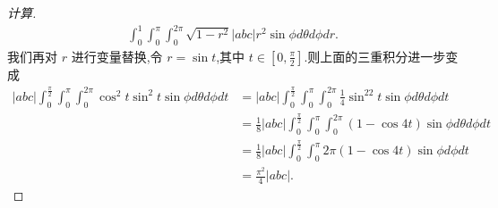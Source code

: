 \documentclass[a4paper, 12pt]{article} %
\begin{document}
\begin{CJK}{UTF8}{gkai}
\begin{proof}[计算]
\begin{align*}
\int_{0}^{1}\int_{0}^{\pi}\int_{0}^{2\pi} \sqrt{1-r^2}|abc|r^2\sin\phi
d\theta d\phi dr.
\end{align*}
我们再对 $r$ 进行变量替换,令 $r=\sin t$,其中 $t\in
[0,\frac{\pi}{2}]$.则上面的三重积分进一步变成
\begin{align*}
|abc|\int_0^{\frac{\pi}{2}}\int_0^{\pi}\int_0^{2\pi}\cos^{2} t\sin^2t\sin\phi
d\theta d\phi
dt&=|abc|\int_0^{\frac{\pi}{2}}\int_0^{\pi}\int_0^{2\pi}\frac{1}{4}\sin^22t\sin\phi
d\theta d\phi
dt\\&=\frac{1}{8}|abc|\int_0^{\frac{\pi}{2}}\int_0^{\pi}\int_0^{2\pi}(1-\cos
4t)\sin\phi d\theta d\phi dt\\&=\frac{1}{8}|abc|
\int_0^{\frac{\pi}{2}}\int_0^{\pi}2\pi(1-\cos 4t)\sin\phi d\phi dt\\&=\frac{\pi^{2}}{4}|abc|.
\end{align*}
  \end{proof}
  
  
  
  
  
\end{CJK}
\end{document}
